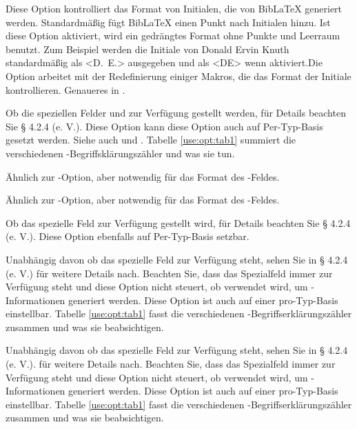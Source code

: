 \documentclass{ltxdockit}[2011/03/25]
\newcommand*{\biblatex}{BibLaTeX\xspace}
\begin{document}
\begin{optionlist}

Diese Option kontrolliert das Format von
Initialen, die von \biblatex generiert werden. Standardmäßig fügt
\biblatex einen Punkt nach Initialen hinzu. Ist diese Option aktiviert,
wird ein gedrängtes Format ohne Punkte und Leerraum benutzt. Zum Beispiel werden
die Initiale von Donald Ervin Knuth standardmäßig als <D.~E.> ausgegeben und
als <DE> wenn aktiviert.Die Option arbeitet 
mit der Redefinierung einiger Makros, die das Format der Initiale kontrollieren.
Genaueres in .


Ob die speziellen Felder  und  zur Verfügung gestellt werden, für Details beachten Sie § 4.2.4 (e. V.). %
Diese Option kann diese Option auch auf
Per-Typ-Basis gesetzt werden. Siehe auch  und .
Tabelle \ref{use:opt:tab1} summiert die verschiedenen -Begriffsklärungszähler
und was sie tun.


Ähnlich zur -Option, aber notwendig für das Format des
-Feldes.


Ähnlich zur -Option, aber notwendig für das Format des
-Feldes.


Ob das spezielle Feld  zur
Verfügung gestellt wird, für Details beachten Sie § 4.2.4 (e. V.).
Diese Option ebenfalls auf Per-Typ-Basis setzbar.


Unabhängig davon ob das spezielle Feld  zur Verfügung steht, 
sehen Sie in § 4.2.4 (e. V.) %
für weitere Details nach. Beachten Sie, dass das Spezialfeld
 immer zur Verfügung steht und diese Option nicht steuert, ob  verwendet wird, um -Informationen generiert werden. Diese Option ist auch auf einer pro-Typ-Basis einstellbar. Tabelle 
\ref{use:opt:tab1} fasst die verschiedenen -Begriffserklärungszähler
zusammen und was sie beabsichtigen.


Unabhängig davon ob das spezielle Feld  zur Verfügung steht, sehen Sie
in § 4.2.4 (e. V.). %
für weitere Details nach. Beachten Sie, dass das Spezialfeld   immer zur Verfügung steht und diese Option nicht steuert, ob  verwendet wird, um -Informationen generiert werden. Diese Option ist auch auf einer pro-Typ-Basis einstellbar. Tabelle  
\ref{use:opt:tab1} fasst die verschiedenen -Begriffserklärungszähler
zusammen und was sie beabsichtigen.


\end{optionlist}
\end{document}
